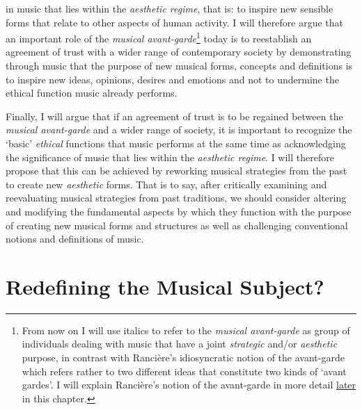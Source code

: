 in music that lies within the \emph{aesthetic regime}, that is: to inspire new sensible forms that relate to other aspects of human activity. I will therefore argue that an important role of the \emph{musical avant-garde}\footnote{From now on I will use italics to refer to the \emph{musical avant-garde} as group of individuals dealing with music that have a joint \emph{strategic} and/or \emph{aesthetic} purpose, in contrast with Ranci\`{e}re's idiosyncratic notion of the avant-garde which refers rather to two different ideas that constitute two kinds of `avant gardes'. I will explain Ranci\`{e}re's notion of the avant-garde in more detail \hyperlink{rethinkavant}{later} in this chapter.} today is to reestablish an agreement of trust with a wider range of contemporary society by demonstrating through music that the purpose of new musical forms, concepts and definitions is to inspire new ideas, opinions, desires and emotions and not to undermine the ethical function music already performs. 

Finally, I will argue that if an agreement of trust is to be regained between the \emph{musical \mbox{avant-garde}} and a wider range of society, it is important to recognize the `basic' \emph{ethical} functions that music performs at the same time as acknowledging the significance of music that lies within the \emph{aesthetic regime}. I will therefore propose that this can be achieved by reworking musical strategies from the past to create new \emph{aesthetic} forms. That is to say, after critically examining and reevaluating musical strategies from past traditions, we should consider altering and modifying the fundamental aspects by which they function with the purpose of creating new musical forms and structures as well as challenging conventional notions and definitions of music.

\hypertarget{eventdis}{}
\section{Redefining the Musical Subject?}

